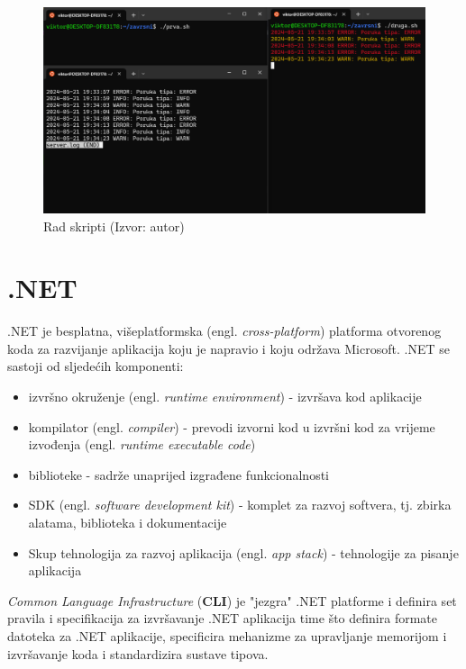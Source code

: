 \documentclass{foi}
\begin{document}
\begin{figure}[H]
    \centering
    \includegraphics[width=1\textwidth]{slike/PrimjerBash.png}
    \caption{Rad skripti (Izvor: autor)}
    \label{fig:primjerbash}
\end{figure}

\chapter{.NET}

.NET je besplatna, višeplatformska (engl. \textit{cross-platform}) platforma otvorenog koda za razvijanje aplikacija koju je napravio i koju održava Microsoft. .NET se sastoji od sljedećih komponenti\cite{NETintro}:
\begin{itemize}
    \item izvršno okruženje (engl. \textit{runtime environment}) - izvršava kod aplikacije
    \item kompilator (engl. \textit{compiler}) - prevodi izvorni kod u izvršni kod za vrijeme izvođenja (engl. \textit{runtime executable code})
    \item biblioteke - sadrže unaprijed izgrađene funkcionalnosti
    \item SDK (engl. \textit{software development kit}) - komplet za razvoj softvera, tj. zbirka alatama, biblioteka i dokumentacije
    \item Skup tehnologija za razvoj aplikacija (engl. \textit{app stack}) - tehnologije za pisanje aplikacija
\end{itemize}

\begin{flushleft}
\textit{Common Language Infrastructure} (\textbf{CLI}) je "jezgra" .NET platforme i definira set pravila i specifikacija za izvršavanje .NET aplikacija time što definira formate datoteka za .NET aplikacije, specificira mehanizme za upravljanje memorijom i izvršavanje koda i standardizira sustave tipova.
\end{flushleft}
\end{document}
